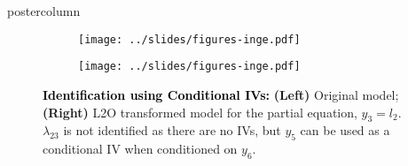 \documentclass{beamer}
\begin{document}
\begin{frame}
\begin{columns}
\begin{column}{.33\textwidth}
\begin{beamercolorbox}[center]{postercolumn}
\begin{minipage}{.98\textwidth}
{\begin{myblock}{}
\begin{figure}
							\begin{subfigure}{0.5 \linewidth}
								\centering
								\texttt{[image: ../slides/figures-inge.pdf]}
							\end{subfigure}%
							\begin{subfigure}{0.5 \linewidth}
								\centering
								\texttt{[image: ../slides/figures-inge.pdf]}
							\end{subfigure}
							\caption*{\textbf{\textcolor{black}{Identification using Conditional IVs:}} \textbf{(Left)} Original model;
									\textbf{(Right)} L2O transformed model for the partial equation, $ y_3 = l_2 $. $ \lambda_{23} $ is not 
									identified as there are no IVs, but $y_5$ can be used as a conditional IV when conditioned on $ y_6 $.}						\end{figure}
					\vspace{-0.45em}
					\end{myblock}\vfill
 				}
			\end{minipage}
		\end{beamercolorbox}
	\end{column}



\end{columns}
\end{frame}
\end{document}
